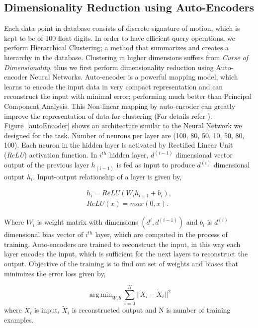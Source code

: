 \documentclass[twocolumn,10pt]{asme2e}
\DeclareMathOperator*{\argminA}{arg\,min}
\begin{document}
\subsection{Dimensionality Reduction using Auto-Encoders}
Each data point in database consists of discrete signature of motion, which is kept to be of 100 float digits.
In order to have efficient query operations, we perform Hierarchical Clustering; a method that summarizes and creates a hierarchy in the database.
Clustering in higher dimensions suffers from \emph{Curse of Dimensionality}\cite{marimont1979}, thus we first perform dimensionality reduction using Auto-encoder Neural Networks.
Auto-encoder is a powerful mapping model, which learns to encode the input data in very compact representation and can reconstruct the input with minimal error; performing much better than Principal Component Analysis\cite{hinton2006}.
This Non-linear mapping by auto-encoder can greatly improve the representation of data for clustering (For details refer \cite{song2013}).
Figure~\ref{autoEncoder} shows an architecture similar to the Neural Network we designed for the task.
Number of neurons per layer are (100, 80, 50, 10, 50, 80, 100).
Each neuron in the hidden layer is activated by Rectified Linear Unit (\emph{ReLU}) activation function.
In $i^{th}$ hidden layer, $d^{(i-1)}$ dimensional vector output of the previous layer $h_(i-1)$ is fed as input to produce $d^{(i)}$ dimensional output $h_i$.
Input-output relationship of a layer is given by,

\begin{eqnarray}\label{nnlayer}
  h_i = ReLU(W_{i}h_{i-1} + b_{i}), \\
  ReLU(x) = max(0, x).
\end{eqnarray}

Where $W_i$ is weight matrix with dimensions $(d^{i}, d^{(i-1)})$ and $b_i$ is $d^{(i)}$ dimensional bias vector of $i^{th}$ layer, which are computed in the process of training.
Auto-encoders are trained to reconstruct the input, in this way each layer encodes the input, which is sufficient for the next layers to reconstruct the output.
Objective of the training is to find out set of weights and biases that minimizes the error loss given by,

\begin{equation}\label{nnloss}
  \argminA_{W, b} \sum_{i=0}^{N} || X_i - \tilde{X}_i ||^2
\end{equation}
where $X_i$ is input, $\tilde{X}_i$ is reconstructed output and N is number of training examples.
\end{document}
